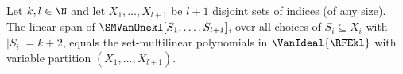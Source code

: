 \begin{theorem}
  \label{thm.smvan1}
  Let \(k,l \in \N\)
  and let \(X_1, \ldots, X_{l+1}\) be \(l+1\) disjoint sets of
  indices (of any size).
  The linear span of $\SMVanOnekl[S_1,\dots,S_{l+1}]$, over all choices of
  $S_i\subseteq X_i$ with $|S_i|=k+2$, equals the set-multilinear 
  polynomials in $\VanIdeal{\RFEkl}$ with variable partition $(X_1, \dots, X_{l+1})$.
\end{theorem}